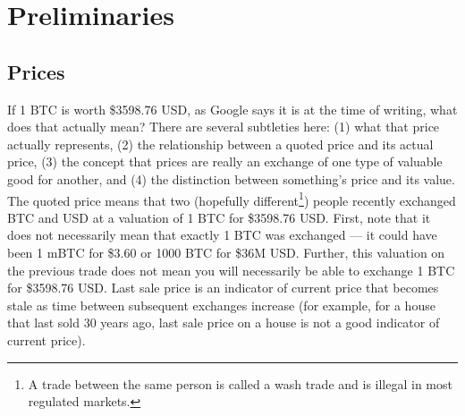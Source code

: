 






\section{Preliminaries}

\subsection{Prices}

If 1 BTC is worth \$3598.76 USD, as Google says it is at the time of writing, what does that actually mean? There are several subtleties here: (1) what that price actually represents, (2) the relationship between a quoted price and its actual price, (3) the concept that prices are really an exchange of one type of valuable good for another, and (4) the distinction between something's price and its value. The quoted price means that two (hopefully different\footnote{A trade between the same person is called a wash trade and is illegal in most regulated markets.}) people recently exchanged BTC and USD at a valuation of 1 BTC for \$3598.76 USD. First, note that it does not necessarily mean that exactly 1 BTC was exchanged --- it could have been 1 mBTC for \$3.60 or 1000 BTC for \$36M USD. Further, this valuation on the previous trade does not mean you will necessarily be able to exchange 1 BTC for \$3598.76 USD. Last sale price is an indicator of current price that becomes stale as time between subsequent exchanges increase (for example, for a house that last sold 30 years ago, last sale price on a house is not a good indicator of current price).

